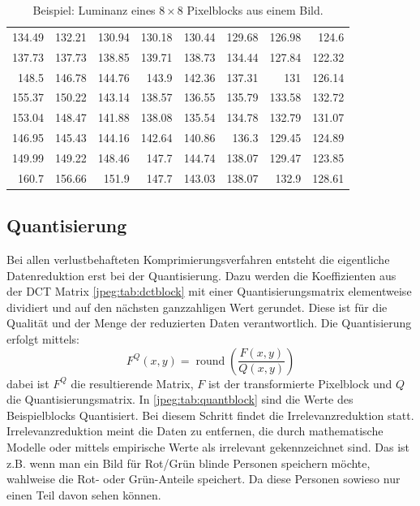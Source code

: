 \begin{table}[b]
    \centering
    \begin{tabular}{*{8}{r}}
        134.49 & 132.21 & 130.94 & 130.18 & 130.44 & 129.68 & 126.98 & 124.6\phantom{0}  \\
        137.73 & 137.73 & 138.85 & 139.71 & 138.73 & 134.44 & 127.84 & 122.32 \\
        148.5\phantom{0}  & 146.78 & 144.76 & 143.9\phantom{0}  & 142.36 & 137.31 & 131\phantom{.00}    & 126.14 \\
        155.37 & 150.22 & 143.14 & 138.57 & 136.55 & 135.79 & 133.58 & 132.72 \\
        153.04 & 148.47 & 141.88 & 138.08 & 135.54 & 134.78 & 132.79 & 131.07 \\
        146.95 & 145.43 & 144.16 & 142.64 & 140.86 & 136.3\phantom{0}  & 129.45 & 124.89 \\
        149.99 & 149.22 & 148.46 & 147.7\phantom{0}  & 144.74 & 138.07 & 129.47 & 123.85 \\
        160.7\phantom{0}  & 156.66 & 151.9\phantom{0}  & 147.7\phantom{0}  & 143.03 & 138.07 & 132.9\phantom{0}  & 128.61
    \end{tabular}
    \caption{Beispiel: Luminanz eines \(8\times8\) Pixelblocks aus einem Bild.
        \label{jpeg:tab:orgblock}}
\end{table}

\subsection{Quantisierung
\label{jpeg:subsection:quantisierung}}
Bei allen verlustbehafteten Komprimierungsverfahren entsteht die eigentliche Datenreduktion erst bei der Quantisierung.
Dazu werden die Koeffizienten aus der DCT Matrix \ref{jpeg:tab:dctblock} mit einer Quantisierungsmatrix elementweise dividiert und auf den nächsten ganzzahligen Wert gerundet.
Diese ist für die Qualität und der Menge der reduzierten Daten verantwortlich.
Die Quantisierung erfolgt mittels: 
\begin{equation}
    F^Q(x,y)
    =
    \operatorname{round} \left(
    \frac{F(x,y)}{Q(x,y)}
    \right)
\end{equation}
dabei ist \(F^Q\) die resultierende Matrix, \(F\) ist der transformierte Pixelblock und \(Q\) die Quantisierungsmatrix.
In \ref{jpeg:tab:quantblock} sind die Werte des Beispielblocks Quantisiert.
Bei diesem Schritt findet die Irrelevanzreduktion statt.
Irrelevanzreduktion meint die Daten zu entfernen, die durch mathematische Modelle oder mittels empirische Werte als irrelevant gekennzeichnet sind.
Das ist z.B. wenn man ein Bild für Rot/Grün blinde Personen speichern möchte, wahlweise die Rot- oder Grün-Anteile speichert.
Da diese Personen sowieso nur einen Teil davon sehen können.

